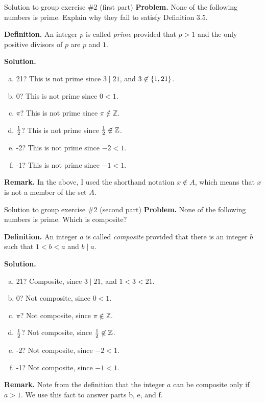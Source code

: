 \documentclass[10pt]{beamer}
\begin{document}
\begin{frame}{Solution to group exercise \#2 (first part)}
\textbf{Problem.} None of the following numbers is prime. Explain why they fail to satisfy Definition 3.5.
\vfill 

\begin{mygreenbox}
\textbf{Definition.} An integer $p$ is called \textit{prime} provided that $p>1$ and the only positive divisors of $p$ are $p$ and $1$.	
\end{mygreenbox}

\vfill 
\textbf{Solution.}
\begin{enumerate}[a.]
\item 21? \pause This is not prime since $3 \mid 21$, and $3 \not\in \{ {1,21} \}$. \pause 
\item 0? \pause This is not prime since $0<1$. \pause 
\item $\pi$? \pause This is not prime since $\pi \not\in \mathbb{Z}$. \pause 
\item $\frac{1}{2}$? \pause This is not prime since $\frac{1}{2} \not\in \mathbb{Z}$. \pause 
\item -2? \pause This is not prime since $-2<1$. \pause 
\item -1? \pause This is not prime since $-1<1$. \pause 
\end{enumerate}
\vfill \vfill \vfill 
\textbf{Remark.} In the above, I used the shorthand notation $x \not\in A$, which means that $x$ is not a member of the set $A$. 
\end{frame}


\begin{frame}{Solution to group exercise \#2 (second part)}
\textbf{Problem.} None of the following numbers is prime. Which is composite?
\vfill 

\begin{mygreenbox}
\textbf{Definition.} An integer $a$ is called \textit{composite} provided that there is an integer $b$ such that $1<b<a$ and $b \mid a$.	
\end{mygreenbox}

\vfill 
\textbf{Solution.}
\begin{enumerate}[a.]
\item 21? \pause Composite, since $3 \mid 21$, and $1<3<21$. \pause 
\item 0? \pause Not composite, since $0<1$. \pause 
\item $\pi$? \pause Not composite, since $\pi \not\in \mathbb{Z}$. \pause 
\item $\frac{1}{2}$? \pause Not composite, since $\frac{1}{2} \not\in \mathbb{Z}$. \pause 
\item -2? \pause Not composite, since $-2 < 1$. \pause 
\item -1? \pause Not composite, since $-1 < 1$. \pause 
\end{enumerate}
\vfill 
\textbf{Remark.} Note from the definition that the integer $a$ can be composite only if $a>1$. We use this fact to answer parts b, e, and f.
\end{frame}
\end{document}
